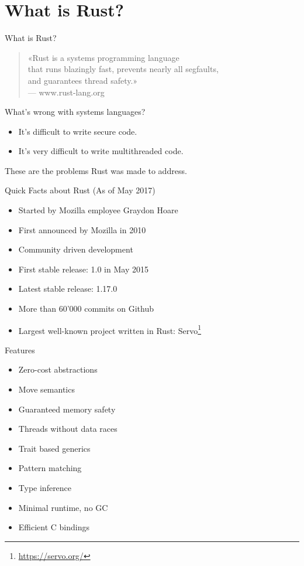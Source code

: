 \section{What is Rust?}


\begin{frame}[c]{What is Rust?}
	\begin{quote}
		«Rust is a systems programming language\\
		that runs blazingly fast, prevents nearly all segfaults,\\
		and guarantees thread safety.»\\
		\vspace{0.5em}
		{\normalfont \small --- www.rust-lang.org}
	\end{quote}
\end{frame}


\begin{frame}{What's wrong with systems languages?}
	\begin{itemize}
		\item It's difficult to write secure code.
		\item It's very difficult to write multithreaded code.
	\end{itemize}
	These are the problems Rust was made to address.
\end{frame}


\begin{frame}{Quick Facts about Rust}
	(As of May 2017)
	\begin{itemize}
		\item Started by Mozilla employee Graydon Hoare
		\item First announced by Mozilla in 2010
		\item Community driven development
		\item First stable release: 1.0 in May 2015
		\item Latest stable release: 1.17.0
		\item More than 60'000 commits on Github
		\item Largest well-known project written in Rust: Servo\footnote{\url{https://servo.org/}}
	\end{itemize}
\end{frame}


\begin{frame}{Features}
	\begin{itemize}
		\item Zero-cost abstractions
		\item Move semantics
		\item Guaranteed memory safety
		\item Threads without data races
		\item Trait based generics
		\item Pattern matching
		\item Type inference
		\item Minimal runtime, no GC
		\item Efficient C bindings
	\end{itemize}
\end{frame}
